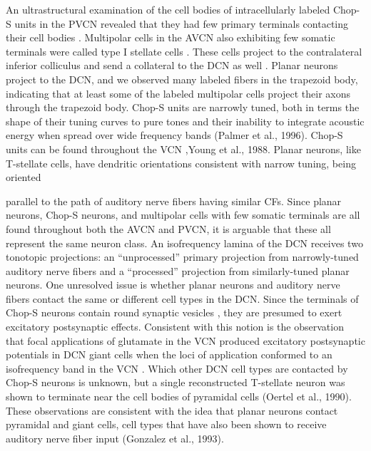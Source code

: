 \documentclass[10pt,a4paper]{article}
\begin{document}
An ultrastructural examination of the cell bodies of intracellularly labeled
Chop-S units in the PVCN revealed that they had few primary terminals contacting their cell bodies
\citep{SmithRhode:1989}. Multipolar cells in the AVCN also exhibiting few
somatic terminals were called type I stellate cells \citep{Cant:1981}. These
cells project to the contralateral inferior colliculus \citep{Cant:1982} and
send a collateral to the DCN as well \citep{Adams:1983}. Planar neurons project
to the DCN, and we observed many labeled fibers in the trapezoid body,
indicating that at least some of the labeled multipolar cells project their
axons through the trapezoid body. Chop-S units are narrowly tuned, both in terms
the shape of their tuning curves to pure tones \citep{RhodeSmith:1986} and their
inability to integrate acoustic energy when spread over wide frequency bands
(Palmer et al., 1996).  Chop-S units can be found throughout the VCN
\citep{Pfeiffer:1966,Bourk, 1976},Young et al., 1988. Planar neurons, like
T-stellate cells, have dendritic orientations consistent with narrow tuning,
being oriented

parallel to the path of auditory nerve fibers having similar CFs. Since planar
neurons, Chop-S neurons, and multipolar cells with few somatic terminals are all
found throughout both the AVCN and PVCN, it is arguable that these all represent
the same neuron class. An isofrequency lamina of the DCN receives two tonotopic
projections: an ``unprocessed''
primary projection from narrowly-tuned auditory nerve fibers and a
``processed'' projection from similarly-tuned planar neurons.
One unresolved issue is whether planar neurons and auditory nerve fibers contact
the same or different cell
types in the DCN. Since the terminals of Chop-S neurons contain round synaptic
vesicles \citep{SmithRhode:1989}, they are presumed to exert excitatory
postsynaptic effects. Consistent with this notion is the observation that focal
applications of glutamate in the VCN produced excitatory postsynaptic potentials
in DCN giant cells when the loci of application conformed to an isofrequency
band in the VCN \citep{ZhangOertel:1993a}. Which other DCN cell types are
contacted by Chop-S neurons is unknown, but a single reconstructed T-stellate
neuron was shown to terminate near the cell bodies of pyramidal cells (Oertel et
al., 1990). These observations are consistent with the idea that planar neurons
contact pyramidal and giant cells, cell types that have also been shown to
receive auditory nerve fiber input (Gonzalez et al., 1993).
\end{document}
